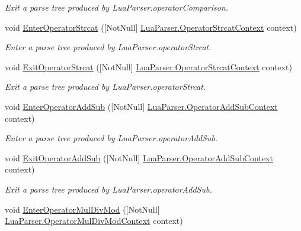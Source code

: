 \begin{DoxyCompactItemize}
\begin{DoxyCompactList}\small\item\em Exit a parse tree produced by Lua\+Parser.\+operator\+Comparison. \end{DoxyCompactList}\item 
void \mbox{\hyperlink{interfacezlua_1_1_i_lua_listener_a9fbd70b572afa004220c8cdcaceb641a}{Enter\+Operator\+Strcat}} (\mbox{[}Not\+Null\mbox{]} \mbox{\hyperlink{classzlua_1_1_lua_parser_1_1_operator_strcat_context}{Lua\+Parser.\+Operator\+Strcat\+Context}} context)
\begin{DoxyCompactList}\small\item\em Enter a parse tree produced by Lua\+Parser.\+operator\+Strcat. \end{DoxyCompactList}\item 
void \mbox{\hyperlink{interfacezlua_1_1_i_lua_listener_a9b0c6b0efb7d5c405477117f0df532fa}{Exit\+Operator\+Strcat}} (\mbox{[}Not\+Null\mbox{]} \mbox{\hyperlink{classzlua_1_1_lua_parser_1_1_operator_strcat_context}{Lua\+Parser.\+Operator\+Strcat\+Context}} context)
\begin{DoxyCompactList}\small\item\em Exit a parse tree produced by Lua\+Parser.\+operator\+Strcat. \end{DoxyCompactList}\item 
void \mbox{\hyperlink{interfacezlua_1_1_i_lua_listener_a145cf8b9fa700148a09b9d68624640f8}{Enter\+Operator\+Add\+Sub}} (\mbox{[}Not\+Null\mbox{]} \mbox{\hyperlink{classzlua_1_1_lua_parser_1_1_operator_add_sub_context}{Lua\+Parser.\+Operator\+Add\+Sub\+Context}} context)
\begin{DoxyCompactList}\small\item\em Enter a parse tree produced by Lua\+Parser.\+operator\+Add\+Sub. \end{DoxyCompactList}\item 
void \mbox{\hyperlink{interfacezlua_1_1_i_lua_listener_a3d98f03e4ef336437a07903ea76df622}{Exit\+Operator\+Add\+Sub}} (\mbox{[}Not\+Null\mbox{]} \mbox{\hyperlink{classzlua_1_1_lua_parser_1_1_operator_add_sub_context}{Lua\+Parser.\+Operator\+Add\+Sub\+Context}} context)
\begin{DoxyCompactList}\small\item\em Exit a parse tree produced by Lua\+Parser.\+operator\+Add\+Sub. \end{DoxyCompactList}\item 
void \mbox{\hyperlink{interfacezlua_1_1_i_lua_listener_ab6bb494a78b26f8483ef9d872c82c8d6}{Enter\+Operator\+Mul\+Div\+Mod}} (\mbox{[}Not\+Null\mbox{]} \mbox{\hyperlink{classzlua_1_1_lua_parser_1_1_operator_mul_div_mod_context}{Lua\+Parser.\+Operator\+Mul\+Div\+Mod\+Context}} context)

\end{DoxyCompactItemize}
